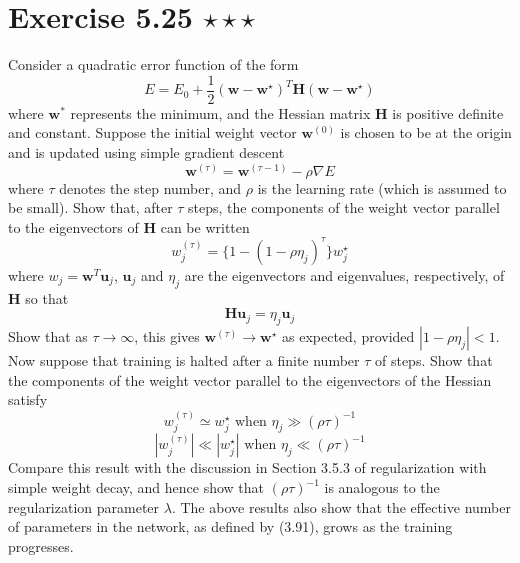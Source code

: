 \section*{Exercise 5.25 $\star \star \star$}
Consider a quadratic error function of the form
 \begin{equation}\label{eq:5.195}\tag{5.195}
     E = E_0 + \frac{1}{2}(\mathbf{w} - \mathbf{w}^\star)^T \mathbf{H} (\mathbf{w} - \mathbf{w}^\star)
\end{equation}
where $\mathbf{w}^*$ represents the minimum, and the Hessian matrix $\mathbf{H}$ is positive
definite and constant. Suppose the initial weight vector $\mathbf{w}^{(0)}$ is chosen to be at the
origin and is updated using simple gradient descent
\begin{equation}\label{eq:5.196}\tag{5.196}
    \mathbf{w}^{(\tau)} = \mathbf{w}^{(\tau - 1)} - \rho \nabla E
\end{equation}
where $\tau$ denotes the step number, and $\rho$ is the learning
rate (which is assumed to be small). Show that, after $\tau$ steps,
the components of the weight vector parallel to the eigenvectors of 
 $\mathbf{H}$ can be written
 \begin{equation}\label{eq:5.197}\tag{5.197}
     w_j^{(\tau)} = \{1 - (1 - \rho \eta_j)^\tau\} w_j^\star
 \end{equation}
 where $w_j = \mathbf{w}^T \mathbf{u}_j$, $\mathbf{u}_j$ and $\eta_j$ are the eigenvectors and eigenvalues,
 respectively, of $\mathbf{H}$ so that
 \begin{equation}\label{eq:5.198}\tag{5.198}
     \mathbf{H}\mathbf{u}_j = \eta_j \mathbf{u}_j
 \end{equation}
 Show that as $\tau \to \infty$, this gives $\mathbf{w}^{(\tau)} \to \mathbf{w}^\star$ as expected,
 provided $|1 - \rho \eta_j| < 1$. Now suppose that training is halted after a finite number $\tau$ 
 of steps. Show that the components of the weight vector parallel to the eigenvectors of the
 Hessian satisfy 
 \begin{equation}\label{eq:5.199}\tag{5.199}
     w_j^{(\tau)} \simeq w_j^\star \text{ when } \eta_j \gg (\rho \tau)^{-1}
\end{equation}
\begin{equation}\label{eq:5.200}\tag{5.200}
     |w_j^{(\tau)}| \ll |w_j^\star| \text{ when } \eta_j \ll (\rho \tau)^{-1}
\end{equation}
Compare this result with the discussion in Section 3.5.3 of regularization with simple
weight decay, and hence show that $(\rho \tau)^{-1}$ is analogous to the regularization
parameter $\lambda$. The above results also show that the effective number of parameters in the 
network, as defined by (3.91), grows as the training progresses.

